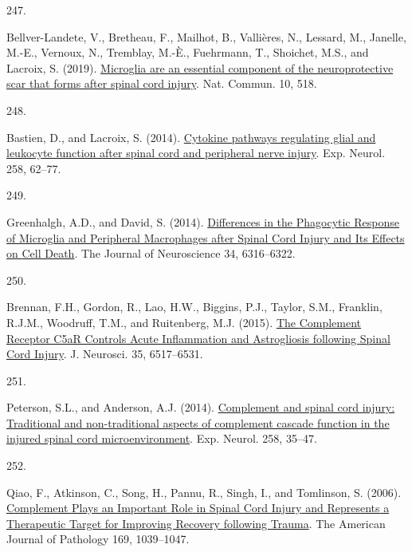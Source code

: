 \documentclass[
]{article}
\newlength{\cslhangindent}
\newlength{\csllabelwidth}
\newlength{\cslentryspacingunit} %
\newenvironment{CSLReferences}[2] %
 {%
  \setlength{\parindent}{0pt}
  \ifodd #1
  \let\oldpar\par
  \def\par{\hangindent=\cslhangindent\oldpar}
  \fi
  \setlength{\parskip}{#2\cslentryspacingunit}
 }%
 {}
\newcommand{\CSLLeftMargin}[1]{\parbox[t]{\csllabelwidth}{#1}}
\newcommand{\CSLRightInline}[1]{\parbox[t]{\linewidth - \csllabelwidth}{#1}\break}
\begin{document}
\begin{CSLReferences}{0}{0}
\leavevmode{}%
\CSLLeftMargin{247. }
\CSLRightInline{Bellver-Landete, V., Bretheau, F., Mailhot, B., Vallières, N., Lessard, M., Janelle, M.-E., Vernoux, N., Tremblay, M.-È., Fuehrmann, T., Shoichet, M.S., and Lacroix, S. (2019). \href{https://doi.org/10.1038/s41467-019-08446-0}{Microglia are an essential component of the neuroprotective scar that forms after spinal cord injury}. Nat. Commun. 10, 518.}

\leavevmode{}%
\CSLLeftMargin{248. }
\CSLRightInline{Bastien, D., and Lacroix, S. (2014). \href{https://doi.org/10.1016/j.expneurol.2014.04.006}{Cytokine pathways regulating glial and leukocyte function after spinal cord and peripheral nerve injury}. Exp. Neurol. 258, 62--77.}

\leavevmode{}%
\CSLLeftMargin{249. }
\CSLRightInline{Greenhalgh, A.D., and David, S. (2014). \href{https://doi.org/10.1523/JNEUROSCI.4912-13.2014}{Differences in the {Phagocytic Response} of {Microglia} and {Peripheral Macrophages} after {Spinal Cord Injury} and {Its Effects} on {Cell Death}}. The Journal of Neuroscience 34, 6316--6322.}

\leavevmode{}%
\CSLLeftMargin{250. }
\CSLRightInline{Brennan, F.H., Gordon, R., Lao, H.W., Biggins, P.J., Taylor, S.M., Franklin, R.J.M., Woodruff, T.M., and Ruitenberg, M.J. (2015). \href{https://doi.org/10.1523/JNEUROSCI.5218-14.2015}{The {Complement Receptor C5aR Controls Acute Inflammation} and {Astrogliosis} following {Spinal Cord Injury}}. J. Neurosci. 35, 6517--6531.}

\leavevmode{}%
\CSLLeftMargin{251. }
\CSLRightInline{Peterson, S.L., and Anderson, A.J. (2014). \href{https://doi.org/10.1016/j.expneurol.2014.04.028}{Complement and spinal cord injury: {Traditional} and non-traditional aspects of complement cascade function in the injured spinal cord microenvironment}. Exp. Neurol. 258, 35--47.}

\leavevmode{}%
\CSLLeftMargin{252. }
\CSLRightInline{Qiao, F., Atkinson, C., Song, H., Pannu, R., Singh, I., and Tomlinson, S. (2006). \href{https://doi.org/10.2353/ajpath.2006.060248}{Complement {Plays} an {Important Role} in {Spinal Cord Injury} and {Represents} a {Therapeutic Target} for {Improving Recovery} following {Trauma}}. The American Journal of Pathology 169, 1039--1047.}


\end{CSLReferences}
\end{document}
